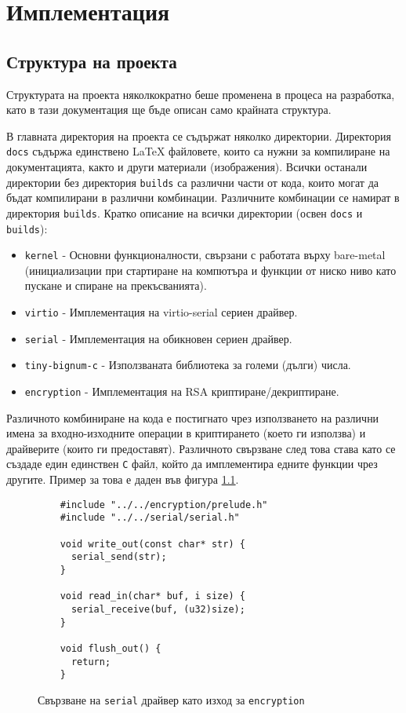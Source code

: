 \chapter{Имплементация} %
\section{Структура на проекта}
Структурата на проекта няколкократно беше променена в процеса на разработка, като в тази документация ще бъде описан само крайната структура.

В главната директория на проекта се съдържат няколко директории. Директория {\tt docs} съдържа единствено \LaTeX{} файловете, които са нужни за компилиране на документацията, както и други материали (изображения). Всички останали директории без директория {\tt builds} са различни части от кода, които могат да бъдат компилирани в различни комбинации. Различните комбинации се намират в директория {\tt builds}. Кратко описание на всички директории (освен {\tt docs} и {\tt builds}):
\begin{itemize}
  \item {\tt kernel} - Основни функционалности, свързани с работата върху bare-metal (инициализации при стартиране на компютъра и функции от ниско ниво като пускане и спиране на прекъсванията).
  \item {\tt virtio} - Имплементация на virtio-serial сериен драйвер.
  \item {\tt serial} - Имплементация на обикновен сериен драйвер.
  \item {\tt tiny-bignum-c} - Използваната библиотека за големи (дълги) числа.
  \item {\tt encryption} - Имплементация на RSA криптиране/декриптиране.
\end{itemize}

Различното комбиниране на кода е постигнато чрез използването на различни имена за входно-изходните операции в криптирането (което ги използва) и драйверите (които ги предоставят). Различното свързване след това става като се създаде един единствен {\tt C} файл, който да имплементира едните функции чрез другите. Пример за това е даден във фигура \ref{fig:io-file-example}.
\begin{figure}[ht]
  \centering
  \caption{Свързване на {\tt serial} драйвер като изход за {\tt encryption}}
  \begin{verbatim}
    #include "../../encryption/prelude.h"
    #include "../../serial/serial.h"

    void write_out(const char* str) {
      serial_send(str);
    }

    void read_in(char* buf, i size) {
      serial_receive(buf, (u32)size);
    }

    void flush_out() {
      return;
    }
  \end{verbatim}
  \label{fig:io-file-example}
\end{figure}

